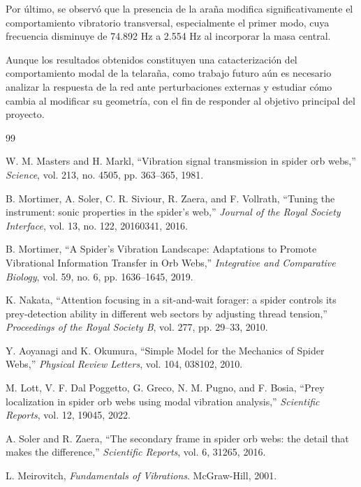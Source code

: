 \documentclass[11pt,letterpaper]{article}
\begin{document}
Por último, se observó que la presencia de la araña modifica significativamente el comportamiento vibratorio transversal, especialmente el primer modo, cuya frecuencia disminuye de 74.892 Hz a 2.554 Hz al incorporar la masa central.

Aunque los resultados obtenidos constituyen una catacterización del comportamiento modal de la telaraña, como trabajo futuro aún es necesario analizar la respuesta de la red ante perturbaciones externas y estudiar cómo cambia al modificar su geometría, con el fin de responder al objetivo principal del proyecto.

\FloatBarrier
\footnotesize\begin{thebibliography}{99}

 W. M. Masters and H. Markl, ``Vibration signal transmission in spider orb webs,'' \textit{Science}, vol. 213, no. 4505, pp. 363--365, 1981.

 B. Mortimer, A. Soler, C. R. Siviour, R. Zaera, and F. Vollrath, ``Tuning the instrument: sonic properties in the spider's web,'' \textit{Journal of the Royal Society Interface}, vol. 13, no. 122, 20160341, 2016.

 B. Mortimer, ``A Spider's Vibration Landscape: Adaptations to Promote Vibrational Information Transfer in Orb Webs,'' \textit{Integrative and Comparative Biology}, vol. 59, no. 6, pp. 1636--1645, 2019.

 K. Nakata, ``Attention focusing in a sit-and-wait forager: a spider controls its prey-detection ability in different web sectors by adjusting thread tension,'' \textit{Proceedings of the Royal Society B}, vol. 277, pp. 29--33, 2010.

 Y. Aoyanagi and K. Okumura, ``Simple Model for the Mechanics of Spider Webs,'' \textit{Physical Review Letters}, vol. 104, 038102, 2010.

 M. Lott, V. F. Dal Poggetto, G. Greco, N. M. Pugno, and F. Bosia, ``Prey localization in spider orb webs using modal vibration analysis,'' \textit{Scientific Reports}, vol. 12, 19045, 2022.

 A. Soler and R. Zaera, ``The secondary frame in spider orb webs: the detail that makes the difference,'' \textit{Scientific Reports}, vol. 6, 31265, 2016.

 L. Meirovitch, \textit{Fundamentals of Vibrations}. McGraw-Hill, 2001.


\end{thebibliography}
\end{document}
